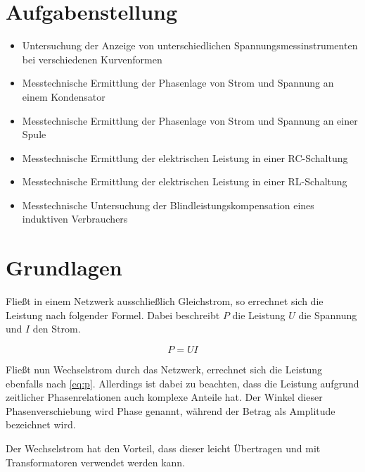\documentclass[11pt,ngerman]{scrartcl}
\begin{document}

\tableofcontents
\newpage

\section{Aufgabenstellung\label{Auf0}}

\begin{itemize}
	\item Untersuchung der Anzeige von unterschiedlichen Spannungsmessinstrumenten bei verschiedenen Kurvenformen

	\item Messtechnische Ermittlung der Phasenlage von Strom und Spannung an einem Kondensator

	\item Messtechnische Ermittlung der Phasenlage von Strom und Spannung an einer Spule

	\item Messtechnische Ermittlung der elektrischen Leistung in einer RC-Schaltung

	\item	Messtechnische Ermittlung der elektrischen Leistung in einer RL-Schaltung

	\item Messtechnische Untersuchung der Blindleistungskompensation eines induktiven Verbrauchers
\end{itemize}

\section{Grundlagen}

Fließt in einem Netzwerk ausschließlich Gleichstrom, so errechnet sich die Leistung nach folgender Formel. Dabei beschreibt $P$ die Leistung $U$ die Spannung und $I$ den Strom.

\begin{equation}
	P = U I
	\label{eq:p}
\end{equation}

Fließt nun Wechselstrom durch das Netzwerk, errechnet sich die Leistung ebenfalls nach \autoref{eq:p}. Allerdings ist dabei zu beachten, dass die Leistung aufgrund zeitlicher Phasenrelationen auch komplexe Anteile hat. Der Winkel dieser Phasenverschiebung wird Phase genannt, während der Betrag als Amplitude bezeichnet wird.

Der Wechselstrom hat den Vorteil, dass dieser leicht Übertragen und mit Transformatoren verwendet werden kann.
\end{document}
